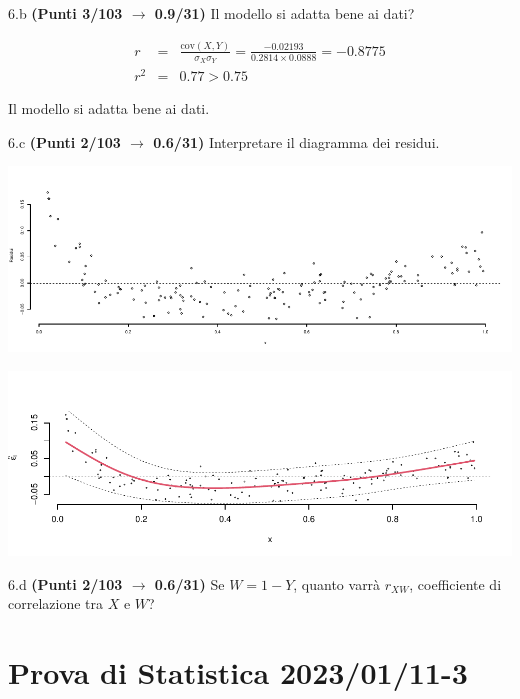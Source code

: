 \documentclass[
  11pt,
]{book}
\theoremstyle{mytheoremstyle}
\theoremstyle{mydefstyle}
\newenvironment{sol}
  {
  \begin{tcolorbox}[enhanced,breakable,arc=0.1mm,boxrule=1pt,colback=white,colframe=iblue,
  title=\bf \fontfamily{lmss}\selectfont \hspace{.5 cm} Soluzione,drop fuzzy shadow]

}{
\end{tcolorbox}
  }
\begin{document}
6.b \textbf{(Punti 3/103 \(\rightarrow\) 0.9/31)} Il modello si adatta bene ai dati?

\begin{sol}
\begin{eqnarray*}
r&=&\frac{\text{cov}(X,Y)}{\sigma_X\sigma_Y}=\frac{ -0.02193 }{ 0.2814 \times 0.0888 }= -0.8775 \\ 
r^2&=& 0.77 > 0.75
\end{eqnarray*}

Il modello si adatta bene ai dati.

\end{sol}

6.c \textbf{(Punti 2/103 \(\rightarrow\) 0.6/31)} Interpretare il diagramma dei residui.

\begin{center}\includegraphics{Esami_passati_con_soluzioni_files/figure-latex/2023-122-1} \end{center}

\begin{sol}

\begin{center}\includegraphics{Esami_passati_con_soluzioni_files/figure-latex/2023-10,-1} \end{center}

\end{sol}

6.d \textbf{(Punti 2/103 \(\rightarrow\) 0.6/31)} Se \(W= 1 - Y\), quanto varrà \(r_{XW}\), coefficiente di correlazione tra \(X\) e \(W\)?

\section{Prova di Statistica 2023/01/11-3}\label{prova-di-statistica-20230111-3}
\end{document}
